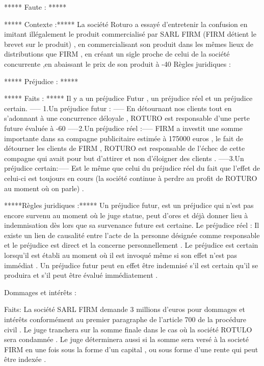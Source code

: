 ***** Faute : *****

***** Contexte :*****
La société Roturo a essayé d'entretenir la confusion en imitant illégalement le produit commercialisé par SARL
FIRM (FIRM détient le brevet sur le produit) , en commercialisant son produit dans les mêmes lieux de
distributions que FIRM , en créant un sigle proche de celui de la société concurrente ,en abaissant le prix de son
produit à -40 %
Règles juridiques :

***** Préjudice : *****

***** Faits : *****
Il y a un préjudice Futur , un préjudice réel et un préjudice certain.
----- 1.Un préjudice futur : -----
En détournant nos clients tout en s'adonnant à une concurrence déloyale , ROTURO est responsable d'une perte
future évaluée à -60 %
-----2.Un préjudice réel :-----
FIRM a investit une somme importante dans sa compagne publicitaire estimée à 175000 euros , le fait de
détourner les clients de FIRM , ROTURO est responsable de l'échec de cette compagne qui avait pour but
d'attirer et non d'éloigner des clients .
-----3.Un préjudice certain:-----
Est le même que celui du préjudice réel du fait que l'effet de celui-ci est toujours en cours (la société continue à
perdre au profit de ROTURO au moment où on parle) .

*****Règles juridiques :*****
Un préjudice futur, est un préjudice qui n'est pas encore survenu au moment où le juge statue, peut d'ores et déjà
donner lieu à indemnisation dès lors que sa survenance future est certaine. Le préjudice réel : Il existe un lien de
causalité entre l'acte de la personne désignée comme responsable et le préjudice est direct et la concerne
personnellement . Le préjudice est certain lorsqu'il est établi au moment où il est invoqué même si son effet n'est
pas immédiat . Un préjudice futur peut en effet être indemnisé s'il est certain qu'il se produira et s'il peut être
évalué immédiatement .




Dommages et intérêts :

Faits:
La société SARL FIRM demande 3 millions d'euros pour dommages et intérêts conformément au premier
paragraphe de l'article 700 de la procédure civil . Le juge tranchera sur la somme finale dans le cas où la société
ROTULO sera condamnée . Le juge déterminera aussi si la somme sera versé à la societé FIRM en une fois sous
la forme d'un capital , ou sous forme d'une rente qui peut être indexée .

